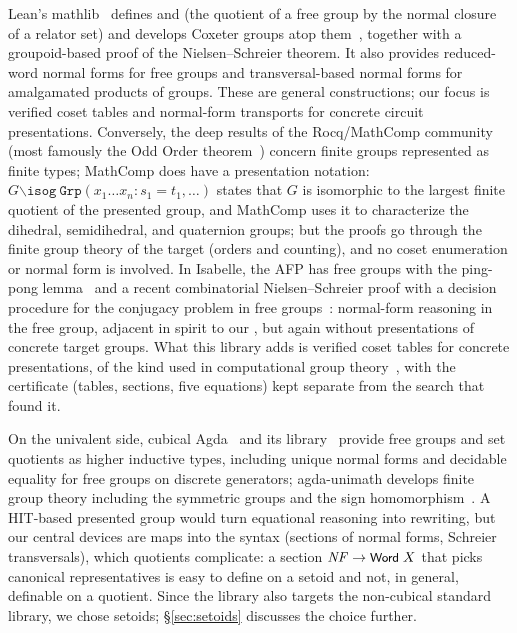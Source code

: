 Lean's mathlib~\cite{mathlib2020} defines  and
 (the quotient of a free group by the normal
closure of a relator set) and develops Coxeter groups atop
them~\cite{mathlib-doc-presented}, together with a groupoid-based proof
of the Nielsen--Schreier theorem.  It also provides reduced-word normal
forms for free groups and transversal-based normal forms for amalgamated
products of groups.  These are general constructions; our focus is
verified coset tables and normal-form transports for concrete circuit
presentations.  Conversely,
the deep results of the Rocq/MathComp community (most famously the Odd
Order theorem~\cite{gonthier2013oddorder}) concern finite groups
represented as finite types; MathComp does have a presentation notation:
$G \mathrel{\backslash\mathtt{isog}}\ \mathtt{Grp}(x_1 \ldots x_n : s_1 =
t_1, \ldots)$ states that $G$ is isomorphic to the largest finite
quotient of the presented group, and MathComp uses it to characterize
the dihedral, semidihedral, and quaternion groups; but the proofs go
through the finite group theory of the target (orders and counting), and
no coset enumeration or normal form is involved.  In Isabelle, the AFP has free
groups with the ping-pong lemma~\cite{breitner2010freegroups} and a
recent combinatorial Nielsen--Schreier proof with a decision procedure
for the conjugacy problem in free groups~\cite{kharim2023freegroups}:
normal-form reasoning in the free group, adjacent in spirit to our
, but again without presentations of concrete
target groups.  What this library adds is
verified coset tables for concrete presentations, of the kind
used in computational group theory~\cite{sims1994computation,
holt2005handbook}, with the certificate (tables, sections,
five equations) kept separate from the search that found it.

On the univalent side, cubical Agda~\cite{vezzosi2019cubical} and its
library~\cite{cubicallibrary} provide free groups and set quotients as
higher inductive types, including unique normal forms and decidable
equality for free groups on discrete generators;
agda-unimath develops finite group theory including the symmetric groups
and the sign homomorphism~\cite{agdaunimath,mangel2023sign}.  A HIT-based
presented group would turn equational reasoning into rewriting, but our
central devices are maps into the syntax (sections of normal
forms, Schreier transversals), which quotients complicate: a section
$\mathit{NF} \to \mbox{\textsf{\small Word}}\;X$ that picks canonical representatives is
easy to define on a setoid and not, in general, definable on a quotient.
Since the library also targets the non-cubical standard library, we chose
setoids; \S\ref{sec:setoids} discusses the choice further.


